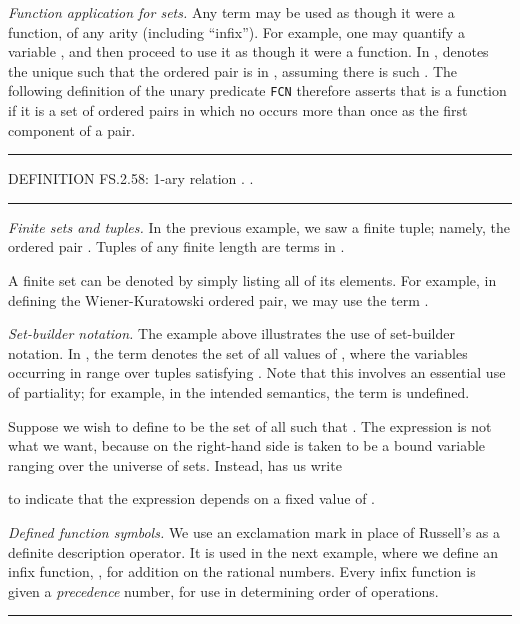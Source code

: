 \documentclass{llncs}
\newcommand{\myrule}{\noindent \rule{\textwidth}{0.3mm}}
\begin{document}
\bigskip

\noindent \emph{Function application for sets.} Any term may be used
as though it were a function, of any arity (including ``infix''). For
example, one may quantify a variable , and then proceed to use it
as though it were a function. In ,  denotes the unique
 such that the ordered pair  is in ,
assuming there is such . The following definition of the unary
predicate {\tt FCN} therefore asserts that  is a function if it is
a set of ordered pairs  in which no  occurs
more than once as the first component of a pair.

\medskip

\myrule

\noindent DEFINITION FS.2.58: 1-ary relation .
.

\myrule

\bigskip

\noindent \emph{Finite sets and tuples.} In the previous example, we saw a finite tuple; namely, the ordered pair . Tuples of any finite length are terms in .

A finite set can be denoted by simply listing all of its elements. For example, in defining the Wiener-Kuratowski ordered pair, we may use the term .

\bigskip

\noindent \emph{Set-builder notation.} The example above illustrates
the use of set-builder notation. In , the term 
denotes the set of all values of , where the
variables  occurring in  range over tuples
satisfying . Note that this involves an essential
use of partiality; for example, in the intended semantics, the term
 is undefined.

Suppose we wish to define  to be the
set of all  such that . The expression
 is
not what we want, because  on the right-hand side is taken to be a
bound variable ranging over the universe of sets. Instead, 
has us write

to indicate that the expression depends on a fixed value of . 

\bigskip

\noindent \emph{Defined function symbols.} We use an exclamation mark
in place of Russell's  as a definite description operator.
It is used in the next example, where we define an infix function,
, for addition on the rational numbers. Every infix function
is given a \emph{precedence} number, for use in determining order of
operations.

\medskip

\myrule
\end{document}
